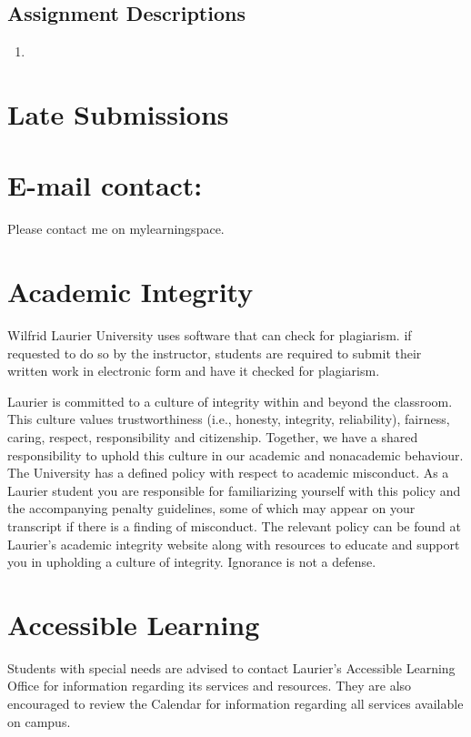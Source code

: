 \documentclass{article}
\begin{document}
\subsection*{Assignment Descriptions}

\begin{enumerate}
\item 
\end{enumerate}



\section*{Late Submissions}

\section*{E-mail contact:}
Please contact me on mylearningspace.

\section*{Academic Integrity}
Wilfrid Laurier University uses software that can check for plagiarism. if requested to do so by the instructor, students are required to submit their written work in electronic form and have it checked for plagiarism.

Laurier is committed to a culture of integrity within and beyond the classroom. This culture values trustworthiness (i.e., honesty, integrity, reliability), fairness, caring, respect, responsibility and citizenship. Together, we have a shared responsibility to uphold this culture in our academic and nonacademic behaviour. The University has a defined policy with respect to academic misconduct. As a Laurier student you are responsible for familiarizing yourself with this policy and the accompanying penalty guidelines, some of which may appear on your transcript if there is a finding of misconduct. The relevant policy can be found at Laurier's academic integrity website along with resources to educate and support you in upholding a culture of integrity. Ignorance is not a defense.



\section*{Accessible Learning}
Students with special needs are advised to contact Laurier's Accessible Learning Office for information regarding its services and resources. They are also encouraged to review the Calendar for information regarding all services available on campus. 
\end{document}
